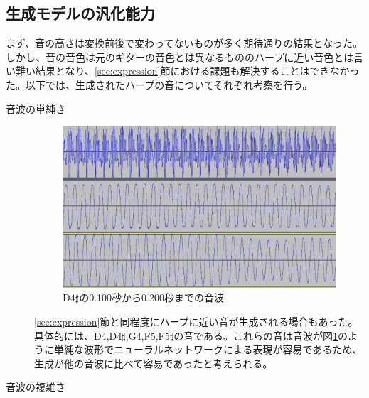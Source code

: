 \subsection{生成モデルの汎化能力}

まず、音の高さは変換前後で変わってないものが多く期待通りの結果となった。しかし、音の音色は元のギターの音色とは異なるもののハープに近い音色とは言い難い結果となり、\ref{sec:expression}節における課題も解決することはできなかった。以下では、生成されたハープの音についてそれぞれ考察を行う。


\begin{description}
\item[音波の単純さ]\mbox{}

\begin{figure}[t]
\begin{center}
\includegraphics[width=0.7\hsize]{figure/66_22_det/d4s_0100_0200.png}
\caption{D4$\sharp$の0.100秒から0.200秒までの音波}
\label{fig:66_22_near}
\end{center}
\end{figure}

\ref{sec:expression}節と同程度にハープに近い音が生成される場合もあった。具体的には、D4,D4$\sharp$,G4,F5,F5$\sharp$の音である。これらの音は音波が図\ref{fig:66_22_near}のように単純な波形でニューラルネットワークによる表現が容易であるため、生成が他の音波に比べて容易であったと考えられる。

\item[音波の複雑さ]\mbox{}


\end{description}

